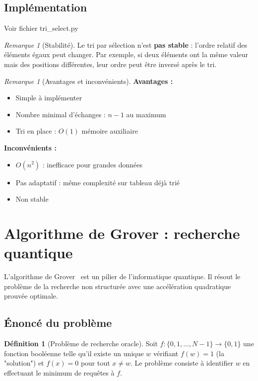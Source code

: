 \documentclass[12pt,a4paper]{article}
\theoremstyle{definition}
\newtheorem{definition}[theorem]{Définition}
\theoremstyle{remark}
\newtheorem{remark}[theorem]{Remarque}
\begin{document}
\subsection{Implémentation}

Voir fichier tri\_select.py

\begin{remark}[Stabilité]
Le tri par sélection n'est \textbf{pas stable} : l'ordre relatif des éléments égaux peut changer. Par exemple, si deux éléments ont la même valeur mais des positions différentes, leur ordre peut être inversé après le tri.
\end{remark}

\begin{remark}[Avantages et inconvénients]
\textbf{Avantages :}
\begin{itemize}
    \item Simple à implémenter
    \item Nombre minimal d'échanges : $n-1$ au maximum
    \item Tri en place : $O(1)$ mémoire auxiliaire
\end{itemize}
\textbf{Inconvénients :}
\begin{itemize}
    \item $O(n^2)$ : inefficace pour grandes données
    \item Pas adaptatif : même complexité sur tableau déjà trié
    \item Non stable
\end{itemize}
\end{remark}

\newpage

\section{Algorithme de Grover : recherche quantique}

L'algorithme de Grover~\cite{grover1996} est un pilier de l'informatique quantique. Il résout le problème de la recherche non structurée avec une accélération quadratique prouvée optimale.

\subsection{Énoncé du problème}

\begin{definition}[Problème de recherche oracle]
Soit $f : \{0, 1, \ldots, N-1\} \to \{0, 1\}$ une fonction booléenne telle qu'il existe un unique $w$ vérifiant $f(w) = 1$ (la "solution") et $f(x) = 0$ pour tout $x \neq w$. Le problème consiste à identifier $w$ en effectuant le minimum de requêtes à $f$.
\end{definition}
\end{document}
